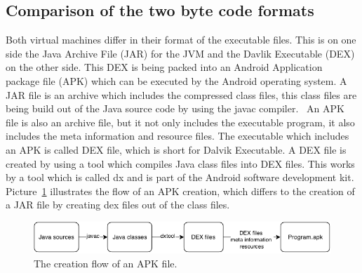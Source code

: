 \subsection{Comparison of the two byte code formats}
\label{sec:comparison-of-the-two-bytecode-formats}
Both virtual machines differ in their format of the executable files.
This is on one side the Java Archive File (JAR) for the JVM and the Davlik Executable (DEX) on the other side.
This DEX is being packed into an Android Application package file (APK) which can be executed by the Android operating system.
A JAR file is an archive which includes the compressed class files, this class files are being build out of the Java source code by using the javac compiler.~\cite{pugh1999compressing} 
An APK file is also an archive file, but it not only includes the executable program, it also includes the meta information and resource files.
The executable which includes an APK is called DEX file, which is short for Dalvik Executable.
A DEX file is created by using a tool which compiles Java class files into DEX files.
This works by a tool which is called dx and is part of the Android software development kit.
Picture~\ref{fig:create-apk} illustrates the flow of an APK creation, which differs to the creation of a JAR file by creating dex files out of the class files.\\
\begin{figure}[h]
\begin{center}
\includegraphics[scale=0.55]{images/create-apk.png} 
\caption{The creation flow of an APK file.}
\label{fig:create-apk}
\end{center}
\end{figure}

